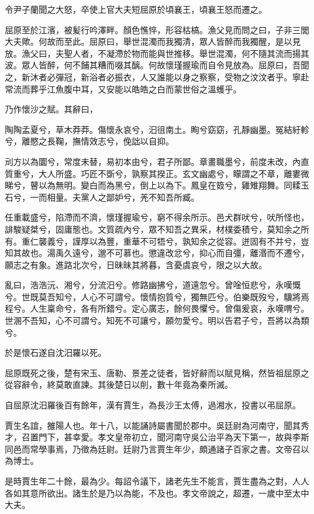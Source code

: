令尹子蘭聞之大怒，卒使上官大夫短屈原於頃襄王，頃襄王怒而遷之。

屈原至於江濱，被髪行吟澤畔。顏色憔悴，形容枯槁。漁父見而問之曰，子非三閭大夫歟。何故而至此。屈原曰，舉世混濁而我獨清，眾人皆醉而我獨醒，是以見放。漁父曰，夫聖人者，不凝滯於物而能與世推移。舉世混濁，何不隨其流而揚其波。眾人皆醉，何不餔其糟而啜其醨。何故懷瑾握瑜而自令見放為。屈原曰，吾聞之，新沐者必彈冠，新浴者必振衣，人又誰能以身之察察，受物之汶汶者乎。寧赴常流而葬乎江魚腹中耳，又安能以皓皓之白而蒙世俗之溫蠖乎。

乃作懷沙之賦。其辭曰，

陶陶孟夏兮，草木莽莽。傷懷永哀兮，汩徂南土。眴兮窈窈，孔靜幽墨。冤結紆軫兮，離愍之長鞠，撫情效志兮，俛詘以自抑。

刓方以為圜兮，常度未替，易初本由兮，君子所鄙。章畫職墨兮，前度未改，內直質重兮，大人所盛。巧匠不斲兮，孰察其揆正。玄文幽處兮，矇謂之不章，離婁微睇兮，瞽以為無明。變白而為黑兮，倒上以為下。鳳皇在笯兮，雞雉翔舞。同糅玉石兮，一而相量。夫黨人之鄙妒兮，羌不知吾所臧。

任重載盛兮，陷滯而不濟，懷瑾握瑜兮，窮不得余所示。邑犬群吠兮，吠所怪也，誹駿疑桀兮，固庸態也。文質疏內兮，眾不知吾之異采，材樸委積兮，莫知余之所有。重仁襲義兮，謹厚以為豐，重華不可牾兮，孰知余之從容。迸固有不并兮，豈知其故也。湯禹久遠兮，邈不可慕也。懲違改忿兮，抑心而自彊，離湣而不遷兮，願志之有象。進路北次兮，日昧昧其將暮，含憂虞哀兮，限之以大故。

亂曰，浩浩沅、湘兮，分流汨兮。修路幽拂兮，道遠忽兮。曾唫恒悲兮，永嘆慨兮。世既莫吾知兮，人心不可謂兮。懷情抱質兮，獨無匹兮。伯樂既歿兮，驥將焉程兮。人生稟命兮，各有所錯兮。定心廣志，餘何畏懼兮。曾傷爰哀，永嘆喟兮。世溷不吾知，心不可謂兮。知死不可讓兮，願勿愛兮。明以告君子兮，吾將以為類兮。

於是懷石遂自沈汨羅以死。

屈原既死之後，楚有宋玉、唐勒、景差之徒者，皆好辭而以賦見稱，然皆祖屈原之從容辭令，終莫敢直諫。其後楚日以削，數十年竟為秦所滅。

自屈原沈汨羅後百有餘年，漢有賈生，為長沙王太傅，過湘水，投書以弔屈原。

賈生名誼，雒陽人也。年十八，以能誦詩屬書聞於郡中。吳廷尉為河南守，聞其秀才，召置門下，甚幸愛。孝文皇帝初立，聞河南守吳公治平為天下第一，故與李斯同邑而常學事焉，乃徵為廷尉。廷尉乃言賈生年少，頗通諸子百家之書。文帝召以為博士。

是時賈生年二十餘，最為少。每詔令議下，諸老先生不能言，賈生盡為之對，人人各如其意所欲出。諸生於是乃以為能，不及也。孝文帝說之，超遷，一歲中至太中大夫。


